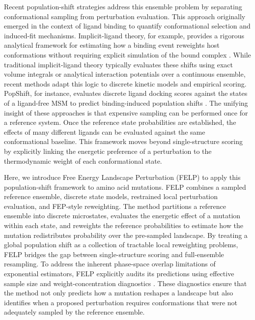 \documentclass[journal=jctcce,manuscript=article,layout=twocolumn,hyperref=true]{achemso}
\begin{document}
	Recent population-shift strategies address this ensemble problem by separating conformational sampling from perturbation evaluation. This approach originally emerged in the context of ligand binding to quantify conformational selection and induced-fit mechanisms. Implicit-ligand theory, for example, provides a rigorous analytical framework for estimating how a binding event reweights host conformations without requiring explicit simulation of the bound complex \cite{minh2012implicit,nguyen2018implicit,schutte2015alchemy}. While traditional implicit-ligand theory typically evaluates these shifts using exact volume integrals or analytical interaction potentials over a continuous ensemble, recent methods adapt this logic to discrete kinetic models and empirical scoring. PopShift, for instance, evaluates discrete ligand docking scores against the states of a ligand-free MSM to predict binding-induced population shifts \cite{smith2024popshift}. The unifying insight of these approaches is that expensive sampling can be performed once for a reference system. Once the reference state probabilities are established, the effects of many different ligands can be evaluated against the same conformational baseline. This framework moves beyond single-structure scoring by explicitly linking the energetic preference of a perturbation to the thermodynamic weight of each conformational state.

	Here, we introduce Free Energy Landscape Perturbation (FELP) to apply this population-shift framework to amino acid mutations. FELP combines a sampled reference ensemble, discrete state models, restrained local perturbation evaluation, and FEP-style reweighting. The method partitions a reference ensemble into discrete microstates, evaluates the energetic effect of a mutation within each state, and reweights the reference probabilities to estimate how the mutation redistributes probability over the pre-sampled landscape. By treating a global population shift as a collection of tractable local reweighting problems, FELP bridges the gap between single-structure scoring and full-ensemble resampling. To address the inherent phase-space overlap limitations of exponential estimators, FELP explicitly audits its predictions using effective sample size and weight-concentration diagnostics \cite{lyman2007ess,zhang2010ess}. These diagnostics ensure that the method not only predicts how a mutation reshapes a landscape but also identifies when a proposed perturbation requires conformations that were not adequately sampled by the reference ensemble.
\end{document}
